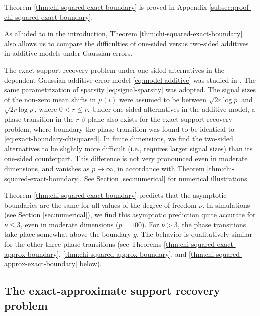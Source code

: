 Theorem \ref{thm:chi-squared-exact-boundary} is proved in Appendix \ref{subsec:proof-chi-squared-exact-boundary}. 

As alluded to in the introduction, Theorem \ref{thm:chi-squared-exact-boundary} also allows us to compare the difficulties of one-sided versus two-sided additives in additive models under Gaussian errors.

\begin{remark} \label{rmk:strong-classification-boundary-1}
The exact support recovery problem under one-sided alternatives in the dependent Gaussian additive error model \eqref{eq:model-additive} was studied in \cite{gao2018fundamental}.
The same parametrization of sparsity \eqref{eq:signal-sparsity} was adopted.
The signal sizes of the non-zero mean shifts in $\mu(i)$ were assumed to be between $\sqrt{2\underline{r}\log{p}}$ and $\sqrt{2\overline{r}\log{p}}$, where $0<\underline{r}\le\overline{r}$.
Under one-sided alternatives in the additive model, a phase transition in the $r$-$\beta$ plane also exists for the exact support recovery problem,
where boundary the phase transition was found to be identical to \eqref{eq:exact-boundary-chisquared}.
In finite dimensions, we find the two-sided alternatives to be slightly more difficult (i.e., requires larger signal sizes) than its one-sided counterpart. 
This difference is not very pronounced even in moderate dimensions, and vanishes as $p\to\infty$, in accordance with Theorem \ref{thm:chi-squared-exact-boundary}. 
See Section \ref{sec:numerical} for numerical illustrations.
\end{remark}

\begin{remark} \label{rmk:strong-classification-boundary-2}
Theorem \ref{thm:chi-squared-exact-boundary} predicts that the asymptotic boundaries are the same for all values of the degree-of-freedom $\nu$.
In simulations (see Section \ref{sec:numerical}), we find this asymptotic prediction quite accurate for $\nu\le3$, even in moderate dimensions ($p=100$). 
For $\nu>3$, the phase transitions take place somewhat above the boundary ${g}$.
The behavior is qualitatively similar for the other three phase transitions (see Theorems \ref{thm:chi-squared-exact-approx-boundary}, \ref{thm:chi-squared-approx-boundary}, and \ref{thm:chi-squared-approx-exact-boundary} below).
\end{remark}

\subsection{The exact-approximate support recovery problem}
\label{subsec:exact-approx-support-recovery-boundary}

